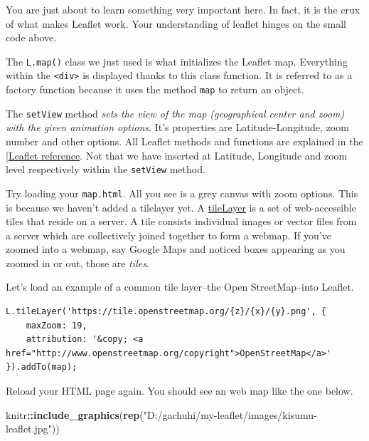 \documentclass[
]{book}
\newenvironment{Shaded}{\begin{snugshade}}{\end{snugshade}}
\newcommand{\FunctionTok}[1]{\textcolor[rgb]{0.13,0.29,0.53}{\textbf{#1}}}
\newcommand{\NormalTok}[1]{#1}
\newcommand{\SpecialCharTok}[1]{\textcolor[rgb]{0.81,0.36,0.00}{\textbf{#1}}}
\newcommand{\StringTok}[1]{\textcolor[rgb]{0.31,0.60,0.02}{#1}}
\begin{document}
You are just about to learn something very important here. In fact, it is the crux of what makes Leaflet work. Your understanding of leaflet hinges on the small code above.

The \texttt{L.map()} class we just used is what initializes the Leaflet map. Everything within the \texttt{\textless{}div\textgreater{}} is displayed thanks to this class function. It is referred to as a factory function because it uses the method \texttt{map} to return an object.

The \texttt{setView} method \emph{sets the view of the map (geographical center and zoom) with the given animation options}. It's properties are Latitude-Longitude, zoom number and other options. All Leaflet methods and functions are explained in the {[}\href{https://leafletjs.com/reference.html}{Leaflet reference}. Not that we have inserted at Latitude, Longitude and zoom level respectively within the \texttt{setView} method.

Try loading your \texttt{map.html}. All you see is a grey canvas with zoom options. This is because we haven't added a tilelayer yet. A \href{https://pro.arcgis.com/en/pro-app/latest/help/data/services/use-tiled-web-layers.htm}{tileLayer} is a set of web-accessible tiles that reside on a server. A tile consists individual images or vector files from a server which are collectively joined together to form a webmap. If you've zoomed into a webmap, say Google Maps and noticed boxes appearing as you zoomed in or out, those are \emph{tiles}.

Let's load an example of a common tile layer--the Open StreetMap--into Leaflet.

\begin{verbatim}
L.tileLayer('https://tile.openstreetmap.org/{z}/{x}/{y}.png', {
    maxZoom: 19,
    attribution: '&copy; <a href="http://www.openstreetmap.org/copyright">OpenStreetMap</a>'
}).addTo(map);
\end{verbatim}

Reload your HTML page again. You should see an web map like the one below.

\begin{Shaded}
\begin{Highlighting}[]
\NormalTok{knitr}\SpecialCharTok{::}\FunctionTok{include\_graphics}\NormalTok{(}\FunctionTok{rep}\NormalTok{(}\StringTok{"D:/gachuhi/my{-}leaflet/images/kisumu{-}leaflet.jpg"}\NormalTok{))}
\end{Highlighting}
\end{Shaded}
\end{document}

